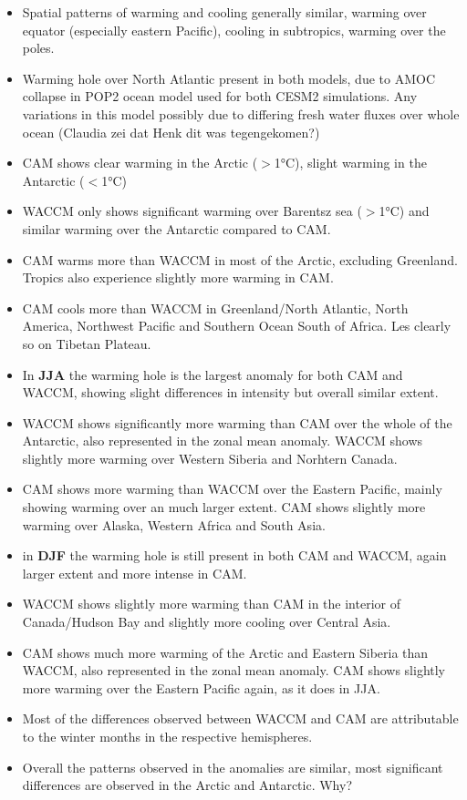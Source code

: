 \begin{itemize}
	\item Spatial patterns of warming and cooling generally similar, warming over equator (especially eastern Pacific), cooling in subtropics, warming over the poles.
	\item Warming hole over North Atlantic present in both models, due to AMOC collapse in POP2 ocean model used for both CESM2 simulations. Any variations in this model possibly due to differing fresh water fluxes over whole ocean (Claudia zei dat Henk dit was tegengekomen?)
	\item CAM shows clear warming in the Arctic ($>$1°C), slight warming in the Antarctic ($<$1°C)
	\item WACCM only shows significant warming over Barentsz sea ($>$1°C) and similar warming over the Antarctic compared to CAM.
	\item CAM warms more than WACCM in most of the Arctic, excluding Greenland. Tropics also experience slightly more warming in CAM.
	\item CAM cools more than WACCM in Greenland/North Atlantic, North America, Northwest Pacific and Southern Ocean South of Africa. Les clearly so on Tibetan Plateau.
	
	\item In \textbf{JJA} the warming hole is the largest anomaly for both CAM and WACCM, showing slight differences in intensity but overall similar extent.
	\item WACCM shows significantly more warming than CAM over the whole of the Antarctic, also represented in the zonal mean anomaly. WACCM shows slightly more warming over Western Siberia and Norhtern Canada. 
	\item CAM shows more warming than WACCM over the Eastern Pacific, mainly showing warming over an much larger extent. CAM shows slightly more warming over Alaska, Western Africa and South Asia. 
	\item in \textbf{DJF} the warming hole is still present in both CAM and WACCM, again larger extent and more intense in CAM. 
	\item WACCM shows slightly more warming than CAM in the interior of Canada/Hudson Bay and slightly more cooling over Central Asia. 
	\item CAM shows much more warming of the Arctic and Eastern Siberia than WACCM, also represented in the zonal mean anomaly. CAM shows slightly more warming over the Eastern Pacific again, as it does in JJA.
	
	\item Most of the differences observed between WACCM and CAM are attributable to the winter months in the respective hemispheres. 
	\item Overall the patterns observed in the anomalies are similar, most significant differences are observed in the Arctic and Antarctic. Why?
\end{itemize}

